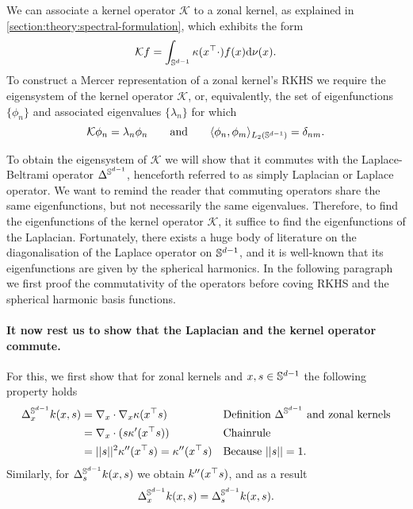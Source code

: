 We can associate a kernel operator $\mathcal{K}$ to a zonal kernel, as explained in \cref{section:theory:spectral-formulation}, which exhibits the form
\begin{equation}
    \label{eq:kernel-operator-zonal}
  \mathcal{K} f = \int_{\mathbb{S}^{d-1}} \kappa(x^{\top}\cdot) f(x) \mathrm{d}{\nu(x)}.
\end{equation}
To construct a Mercer representation of a zonal kernel's RKHS we require the eigensystem of the kernel operator $\mathcal{K}$, or, equivalently, the set of eigenfunctions $\{\phi_n\}$ and associated eigenvalues $\{\lambda_n\}$ for which
\begin{equation}
    \mathcal{K} \phi_n = \lambda_n \phi_n\qquad\text{and}\qquad \langle \phi_n, \phi_m \rangle_{L_2(\mathbb{S}^{d-1})} = \delta_{nm}.
\end{equation}

To obtain the eigensystem of $\mathcal{K}$ we will show that it commutes with the Laplace-Beltrami operator $\Delta^{\mathbb{S}^{d-1}}$, henceforth referred to as simply Laplacian or Laplace operator. We want to remind the reader that commuting operators share the same eigenfunctions, but not necessarily the same eigenvalues. Therefore, to find the eigenfunctions of the kernel operator $\mathcal{K}$, it suffice to find the eigenfunctions of the Laplacian. Fortunately, there exists a huge body of literature on the diagonalisation of the Laplace operator on $\mathbb{S}^{d-1}$, and it is well-known that its eigenfunctions are given by the spherical harmonics. In the following paragraph we first proof the commutativity of the operators before coving RKHS and the spherical harmonic basis functions.

\paragraph{It now rest us to show that the Laplacian and the kernel operator commute.} For this, we first show that for zonal kernels and $x,s \in \mathbb{S}^{d-1}$ the following property holds
\begin{align}
    \Delta^{\mathbb{S}^{d-1}}_x k(x, s) 
     &= \nabla_x \cdot \nabla_x \kappa(x^{\top} s) && \text{Definition $\Delta^{\mathbb{S}^{d-1}}$ and zonal kernels}\\
     &= \nabla_x \cdot (s \kappa'(x^{\top} s))  && \text{Chainrule} \\
     &= \lvert\lvert s\rvert\rvert^2 \kappa''(x^{\top} s) = \kappa''(x ^{\top} s) && \text{Because } \lvert\lvert s\rvert\rvert = 1.
\end{align}
Similarly, for $\Delta^{\mathbb{S}^{d-1}}_s k(x, s)$ we obtain $k''(x ^{\top} s)$, and as a result
\begin{equation}
    \label{eq:LaplaceBeltrami-x-s}
\Delta^{\mathbb{S}^{d-1}}_x k(x, s) = \Delta^{\mathbb{S}^{d-1}}_s k(x, s).
\end{equation}

